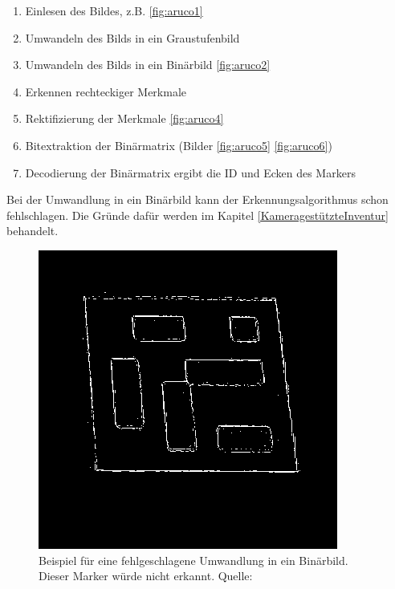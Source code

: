 \begin{enumerate}
    \item Einlesen des Bildes, z.B. \ref{fig:aruco1}
    \item Umwandeln des Bilds in ein Graustufenbild 
    \item Umwandeln des Bilds in ein Binärbild \ref{fig:aruco2}
    \item Erkennen rechteckiger Merkmale
    \item Rektifizierung der Merkmale \ref{fig:aruco4}
    \item Bitextraktion der Binärmatrix (Bilder \ref{fig:aruco5} \ref{fig:aruco6})
    \item Decodierung der Binärmatrix ergibt die ID und Ecken des Markers
\end{enumerate}

Bei der Umwandlung in ein Binärbild kann der Erkennungsalgorithmus schon fehlschlagen. Die Gründe dafür werden im Kapitel \ref{KameragestützteInventur}
behandelt.

\begin{figure}
    \caption{Beispiel für eine fehlgeschlagene Umwandlung in ein Binärbild. Dieser Marker würde nicht erkannt. Quelle: \cite[OpenCV]{OpenCVaruco}}\label{fig:aruco3}
    \includegraphics[width = \textwidth/2]{Bilder/singlemarkersbrokenthresh.png}
    \centering
\end{figure}

